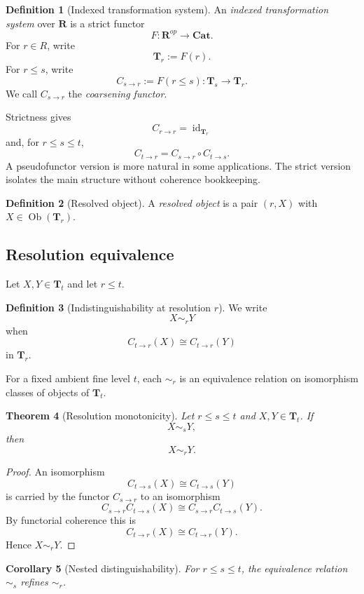 \documentclass[11pt]{article}
\newtheorem{theorem}{Theorem}[section]
\newtheorem{corollary}[theorem]{Corollary}
\theoremstyle{definition}
\newtheorem{definition}[theorem]{Definition}
\theoremstyle{remark}
\newcommand{\Rcat}{\mathbf R}
\newcommand{\Tcat}{\mathbf T}
\newcommand{\Cat}{\mathbf{Cat}}
\newcommand{\Ob}{\operatorname{Ob}}
\newcommand{\id}{\operatorname{id}}
\begin{document}
\begin{definition}[Indexed transformation system]
An \emph{indexed transformation system} over $\Rcat$ is a strict functor
\[
F:\Rcat^{op}\longrightarrow\Cat.
\]
For $r\in R$, write
\[
\Tcat_r:=F(r).
\]
For $r\le s$, write
\[
C_{s\to r}:=F(r\le s):\Tcat_s\longrightarrow\Tcat_r.
\]
We call $C_{s\to r}$ the \emph{coarsening functor}.
\end{definition}

Strictness gives
\[
C_{r\to r}=\id_{\Tcat_r}
\]
and, for $r\le s\le t$,
\[
C_{t\to r}=C_{s\to r}\circ C_{t\to s}.
\]
A pseudofunctor version is more natural in some applications. The strict version isolates the main structure without coherence bookkeeping.

\begin{definition}[Resolved object]
A \emph{resolved object} is a pair $(r,X)$ with $X\in\Ob(\Tcat_r)$.
\end{definition}

\subsection{Resolution equivalence}

Let $X,Y\in\Tcat_t$ and let $r\le t$.

\begin{definition}[Indistinguishability at resolution $r$]
We write
\[
X\sim_r Y
\]
when
\[
C_{t\to r}(X)\cong C_{t\to r}(Y)
\]
in $\Tcat_r$.
\end{definition}

For a fixed ambient fine level $t$, each $\sim_r$ is an equivalence relation on isomorphism classes of objects of $\Tcat_t$.

\begin{theorem}[Resolution monotonicity]\label{thm:resolution-monotonicity}
Let $r\le s\le t$ and $X,Y\in\Tcat_t$. If
\[
X\sim_sY,
\]
then
\[
X\sim_rY.
\]
\end{theorem}

\begin{proof}
An isomorphism
\[
C_{t\to s}(X)\cong C_{t\to s}(Y)
\]
is carried by the functor $C_{s\to r}$ to an isomorphism
\[
C_{s\to r}C_{t\to s}(X)
\cong
C_{s\to r}C_{t\to s}(Y).
\]
By functorial coherence this is
\[
C_{t\to r}(X)\cong C_{t\to r}(Y).
\]
Hence $X\sim_rY$.
\end{proof}

\begin{corollary}[Nested distinguishability]\label{cor:nested}
For $r\le s\le t$, the equivalence relation $\sim_s$ refines $\sim_r$.
\end{corollary}
\end{document}
